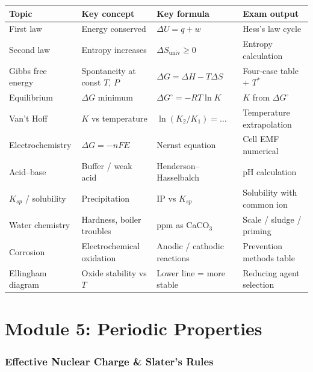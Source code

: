\documentclass[12pt,a4paper]{article}
\newcommand{\moduletitle}{Combined Notes}
\begin{document}
\begin{tcolorbox}[tikzbox, title={Summary Reference Table --- Module 4}]
\begin{tabularx}{\linewidth}{|B{2.6cm}|Y|Y|Y|}
\hline
\textbf{Topic} & \textbf{Key concept} & \textbf{Key formula} & \textbf{Exam output} \\
\hline
First law & Energy conserved & $\Delta U = q + w$ & Hess's law cycle \\
\hline
Second law & Entropy increases & $\Delta S_{\mathrm{univ}} \geq 0$ & Entropy calculation \\
\hline
Gibbs free energy & Spontaneity at const $T$, $P$ & $\Delta G = \Delta H - T\Delta S$ & Four-case table + $T^*$ \\
\hline
Equilibrium & $\Delta G$ minimum & $\Delta G^\circ = -RT\ln K$ & $K$ from $\Delta G^\circ$ \\
\hline
Van't Hoff & $K$ vs temperature & $\ln(K_2/K_1) = \ldots$ & Temperature extrapolation \\
\hline
Electrochemistry & $\Delta G = -nFE$ & Nernst equation & Cell EMF numerical \\
\hline
Acid--base & Buffer / weak acid & Henderson--Hasselbalch & pH calculation \\
\hline
$K_{sp}$ / solubility & Precipitation & IP vs $K_{sp}$ & Solubility with common ion \\
\hline
Water chemistry & Hardness, boiler troubles & ppm as CaCO$_3$ & Scale / sludge / priming \\
\hline
Corrosion & Electrochemical oxidation & Anodic / cathodic reactions & Prevention methods table \\
\hline
Ellingham diagram & Oxide stability vs $T$ & Lower line = more stable & Reducing agent selection \\
\hline
\end{tabularx}
\end{tcolorbox}

\newpage
\renewcommand{\moduletitle}{Module 5 --- Periodic Properties}
\part{Module 5: Periodic Properties}
\setcounter{section}{0}

\section{Effective Nuclear Charge \& Slater's Rules}
\end{document}
